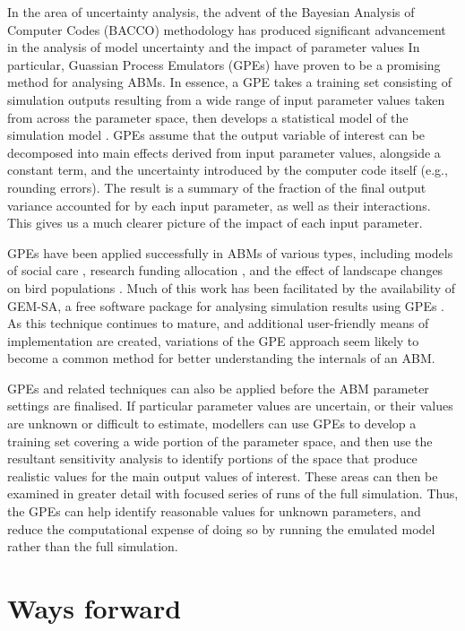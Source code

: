 \documentclass[review]{elsarticle}
\begin{document}
In the area of uncertainty analysis, the advent of the Bayesian Analysis of Computer Codes (BACCO) methodology has produced significant advancement in the analysis of model uncertainty and the impact of parameter values \citep{ohagan06}
In particular, Guassian Process Emulators (GPEs) have proven to be a promising method for analysing ABMs.  In essence, a GPE takes a training set consisting of simulation outputs resulting from a wide range of input parameter values taken from across the parameter space, then develops a statistical model of the simulation model \citep{kennedy01}.  GPEs assume that the output variable of interest can be decomposed into main effects derived from input parameter values, alongside a constant term, and the uncertainty introduced by the computer code itself (e.g., rounding errors).  The result is a summary of the fraction of the final output variance accounted for by each input parameter, as well as their interactions.  This gives us a much clearer picture of the impact of each input parameter.

GPEs have been applied successfully in ABMs of various types, including models of social care \citep{silverman2013soc}, research funding allocation \citep{silverman2016}, and the effect of landscape changes on bird populations \citep{parry2013}.  Much of this work has been facilitated by the availability of GEM-SA, a free software package for analysing simulation results using GPEs \citep{kennedy2004}.  As this technique continues to mature, and additional user-friendly means of implementation are created, variations of the GPE approach seem likely to become a common method for better understanding the internals of an ABM.

GPEs and related techniques can also be applied before the ABM parameter settings are finalised.  If particular parameter values are uncertain, or their values are unknown or difficult to estimate, modellers can use GPEs to develop a training set covering a wide portion of the parameter space, and then use the resultant sensitivity analysis to identify portions of the space that produce realistic values for the main output values of interest.  These areas can then be examined in greater detail with focused series of runs of the full simulation.  Thus, the GPEs can help identify reasonable values for unknown parameters, and reduce the computational expense of doing so by running the emulated model rather than the full simulation.


\section{Ways forward}
\end{document}
